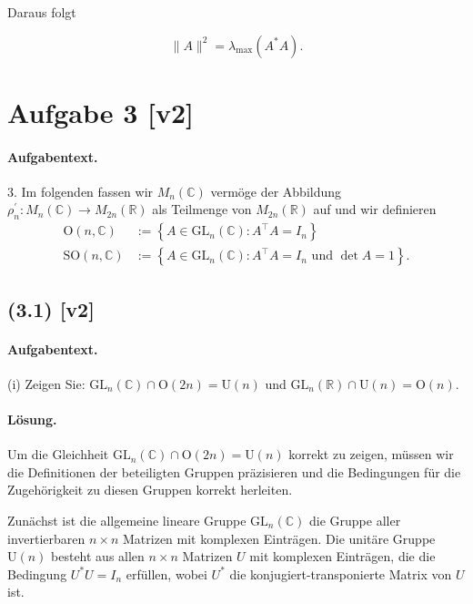 \documentclass[11pt,a4paper]{article}
\begin{document}
Daraus folgt

\[
\|A\|^2 = \lambda_{\max}(A^* A).
\]


\section*{Aufgabe 3 [v2]}
\paragraph{Aufgabentext.}
3. Im folgenden fassen wir $M_n(\mathbb{C})$ vermöge der Abbildung $\rho_n^{\prime}: M_n(\mathbb{C}) \rightarrow M_{2 n}(\mathbb{R})$ als Teilmenge von $M_{2 n}(\mathbb{R})$ auf und wir definieren
$$
\begin{aligned}
\mathrm{O}(n, \mathbb{C}) & :=\left\{A \in \mathrm{GL}_n(\mathbb{C}): A^{\top} A=I_n\right\} \\
\mathrm{SO}(n, \mathbb{C}) & :=\left\{A \in \mathrm{GL}_n(\mathbb{C}): A^{\top} A=I_n \text { und } \operatorname{det} A=1\right\} .
\end{aligned}
$$

\subsection*{(3.1) [v2]}
\paragraph{Aufgabentext.}
(i) Zeigen Sie: $\mathrm{GL}_n(\mathbb{C}) \cap \mathrm{O}(2 n)=\mathrm{U}(n)$ und $\mathrm{GL}_n(\mathbb{R}) \cap \mathrm{U}(n)=\mathrm{O}(n)$.

\paragraph{Lösung.}
Um die Gleichheit $\mathrm{GL}_n(\mathbb{C}) \cap \mathrm{O}(2n) = \mathrm{U}(n)$ korrekt zu zeigen, müssen wir die Definitionen der beteiligten Gruppen präzisieren und die Bedingungen für die Zugehörigkeit zu diesen Gruppen korrekt herleiten.

Zunächst ist die allgemeine lineare Gruppe $\mathrm{GL}_n(\mathbb{C})$ die Gruppe aller invertierbaren $n \times n$ Matrizen mit komplexen Einträgen. Die unitäre Gruppe $\mathrm{U}(n)$ besteht aus allen $n \times n$ Matrizen $U$ mit komplexen Einträgen, die die Bedingung $U^* U = I_n$ erfüllen, wobei $U^*$ die konjugiert-transponierte Matrix von $U$ ist.
\end{document}
